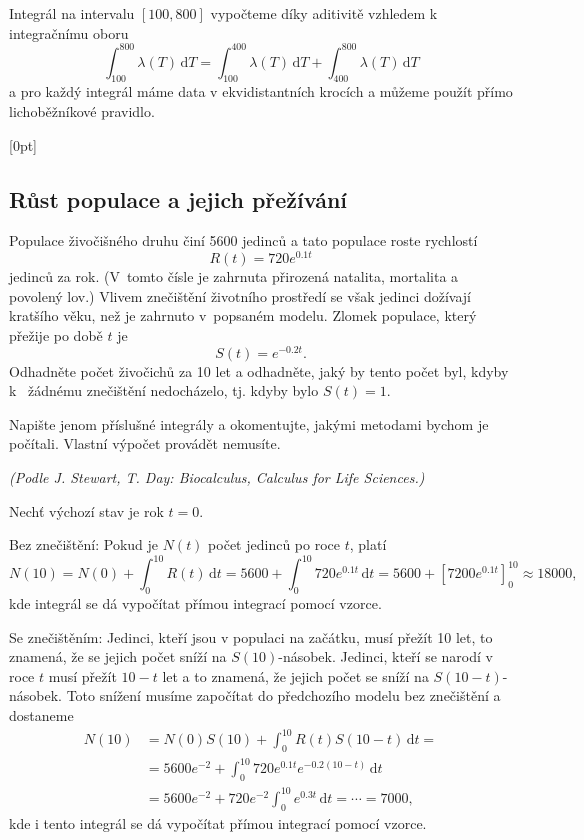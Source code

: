 Integrál na intervalu $[100,800]$ vypočteme díky aditivitě vzhledem k
integračnímu oboru
$$\int_{100}^{800}\lambda(T)\,\mathrm dT=\int_{100}^{400}\lambda(T)\,\mathrm dT+\int_{400}^{800}\lambda(T)\,\mathrm dT$$
a pro každý integrál máme data v ekvidistantních krocích a můžeme
použít přímo lichoběžníkové pravidlo.
\konec

\stranka





[0pt]

\def\mezera{\vspace*{10pt}}

\subsection{Růst populace a jejich přežívání}  Populace živočišného druhu
činí 5600 jedinců a tato populace roste rychlostí
$$R(t)=720 e^{0.1t}$$ jedinců za rok. (V tomto čísle je zahrnuta
přirozená natalita, mortalita a povolený lov.) Vlivem znečištění
životního prostředí se však jedinci dožívají kratšího věku, než je
zahrnuto v popsaném modelu. Zlomek populace, který přežije po době $t$
je $$S(t)=e^{-0.2t}.$$ Odhadněte počet živočichů za 10 let a
odhadněte, jaký by tento počet byl, kdyby k~ žádnému znečištění
nedocházelo, tj. kdyby bylo $S(t)=1$.

Napište jenom příslušné integrály a okomentujte, jakými metodami
bychom je počítali. Vlastní výpočet provádět nemusíte.

\textit{(Podle J. Stewart, T. Day: Biocalculus,  Calculus for Life Sciences.)}

\reseni
Nechť výchozí stav je rok $t=0$.

Bez znečištění:
Pokud je $N(t)$ počet jedinců po roce $t$, platí
$$N(10)=N(0)+\int_0^{10} R(t)\,\mathrm dt=5600+\int_0^{10} 720 e^{0.1 t}\,\mathrm dt=
5600+\left[7200 e^{0.1t}\right]_0^{10}\approx 18000,
$$
kde integrál se dá vypočítat přímou integrací pomocí vzorce.

Se znečištěním: Jedinci, kteří jsou v populaci na začátku, musí přežít 10 let, to znamená, že se jejich počet sníží na $S(10)$-násobek. Jedinci, kteří se narodí v roce $t$ musí přežít $10-t$ let a to znamená, že jejich počet se sníží na $S(10-t)$-násobek. Toto snížení musíme započítat do předchozího modelu bez znečištění a dostaneme
$$
\begin{aligned}
N(10)&=N(0)S(10)+\int_0^{10} R(t)S(10-t)\,\mathrm dt=\\&=5600 e^{-2}+\int_0^{10} 720 e^{0.1 t}e^{-0.2(10-t)}\,\mathrm dt\\&=
5600 e^{-2}+720 e^{-2} \int_0^{10}  e^{0.3 t}\,\mathrm dt=
\cdots =7000,
\end{aligned}
$$
kde i tento integrál se dá vypočítat přímou integrací pomocí vzorce.

